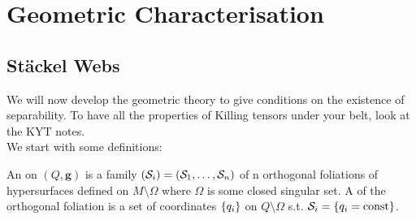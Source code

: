 \documentclass{article}
\begin{document}
\begin{comment}
Suppose we make the transform $H \to \tilde{H} = e^{2f}H$ for $f \in C^\infty(Q)$, the LCSCs become (using the notation $\del_j f = f_{j}, \ ,\del_i\del_j f = f_{ij}, \, \del^iH = H^i, \dots$ and again not summing over $i,j$) (\hl{is this correct?}).
\eq{
0 =& e^{6f}\left\lbrace H^{ij}(H_{i} + Hf_{i})(H_{j} + Hf_{j}) + (H f_i f_j + Hf_{ij} + H_i f_j + H_j f_i + H_{ij})H^i H^j \right.\\
& \left. - (H^i_j + H^i f_j)(H_i + Hf_i)H^j - (H^j_i + H^j f_i)(H_j + Hf_j)H^i \right\rbrace \\
\Rightarrow 0 =& H^{ij}(HH_i f_j + HH_j f_i + H^2 f_i f_j) + H^i H^j(H f_i f_j + H f_{ij} + H_i f_j + H_j f_i) \\
& - H^j(H H^i_j f_i + H^i H_i f_j + H^i H f_i f_j)  - H^i(H H^j_i f_j + H^j H_j f_i + H^j H f_i f_j) \\
=& H\psquare{H^{ij}(H_i f_j + H_j f_i + H f_i f_j) +  H^i H^j(f_{ij} - f_i f_j) - (H^j H^i_j + H^i H^j_i)} 
}
If we have a diagonal separable metric $g^{aa}$ s.t. $H = \frac{1}{2} g^{aa} p_a^2$ we get 
\eq{
0 &= \pbrace{ f_{ab} - f_a f_b - (\del_b \log g^{aa} + \del_a \log g^{bb})} g^{aa}g^{bb}p_a p_b
}
\end{comment}

\section{Geometric Characterisation}

\subsection{St\"ackel Webs}

We will now develop the geometric theory to give conditions on the existence of separability. To have all the properties of Killing tensors under your belt, look at the KYT notes. \\
We start with some definitions:

\begin{definition}
An  on $(Q,\bm{g})$ is a family $(\mathcal{S}_i) = (\mathcal{S}_1, \dots, \mathcal{S}_n)$ of n orthogonal foliations of hypersurfaces defined on $M\setminus \Omega$ where $\Omega$ is some closed singular set. A  of the orthogonal foliation is a set of coordinates $\left\{ q_i \right\}$ on $Q\setminus \Omega$ s.t. $\mathcal{S}_i = \left\{ q_i = \text{const} \right\}$.
\end{definition}
\end{document}
